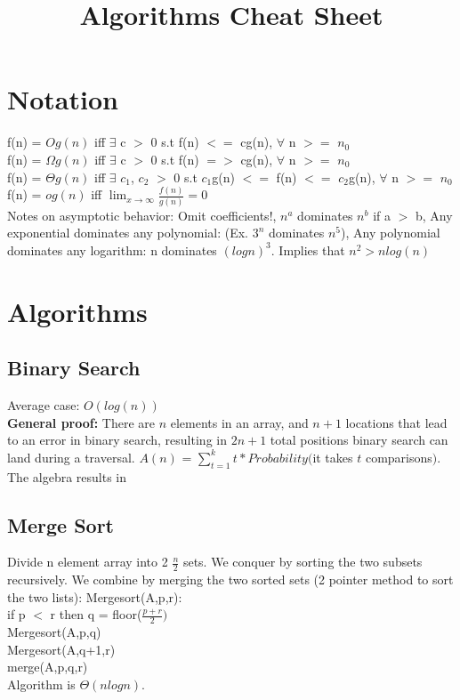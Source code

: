 \documentclass{article}
\begin{document}
\begin{center}
\title{Algorithms Cheat Sheet}
\end{center}
\section*{Notation}
f(n) = $Og(n)$ iff $\exists$ c $>$ 0 s.t f(n) $<=$ cg(n), $\forall$ n $>=$ $n_0$ \\
f(n) = $\Omega g(n)$ iff $\exists$ c $>$ 0 s.t f(n) $=>$ cg(n), $\forall$ n $>=$ $n_0$ \\
f(n) = $\Theta g(n)$ iff $\exists$ $c_1$, $c_2$ $>$ 0 s.t $c_1$g(n) $<=$ f(n) $<=$ $c_2$g(n), $\forall$ n $>=$ $n_0$ \\
f(n) = $og(n)$ iff  $\lim_{x \to \infty} \frac{f(n)}{g(n)} = 0$ \\
Notes on asymptotic behavior: Omit coefficients!, $n^a$ dominates $n^b$ if a $>$ b, Any exponential dominates any polynomial: (Ex. $3^n$ dominates $n^5$), Any polynomial dominates any logarithm: n dominates $(log n)^3$. Implies that $n^2 > nlog(n)$
\section*{Algorithms}
\subsection*{Binary Search}
Average case: $O(log(n))$ \\
\textbf{General proof:} There are $n$ elements in an array, and $n+1$ locations that lead to an error in binary search, resulting in $2n+1$ total positions binary search can land during a traversal. $A(n)$ = $\sum_{t=1}^{k} t * Probability($it takes $t$ comparisons$)$. The algebra results in 
\subsection*{Merge Sort}
Divide n element array into 2 $\frac{n}{2}$ sets. We conquer by sorting the two subsets recursively. We combine by merging the two sorted sets (2 pointer method to sort the two lists):
Mergesort(A,p,r): \\
if p $<$ r then q = floor($\frac{p+r}{2})$ \\
Mergesort(A,p,q) \\
Mergesort(A,q+1,r) \\
merge(A,p,q,r)\\
Algorithm is $\Theta(nlogn)$.
\end{document}
